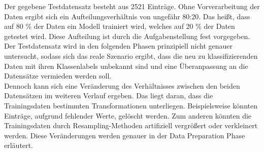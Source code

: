 Der gegebene Testdatensatz besteht aus 2521 Einträge. Ohne Vorverarbeitung der Daten ergibt sich ein Aufteilungsverhältnis von ungefähr 80:20. Das heißt, dass auf 80 \%  der Daten ein Modell trainiert wird, welches auf 20 \% der Daten getestet wird. Diese Aufteilung ist durch die Aufgabenstellung fest vorgegeben. Der Testdatensatz wird in den folgenden Phasen prinzipiell nicht genauer untersucht, sodass sich das reale Szenario ergibt, dass die neu zu klassifizierenden Daten mit ihren Klassenlabels unbekannt sind und eine Überanpassung an die Datensätze vermieden werden soll.\\

Dennoch kann sich eine Veränderung des Verhältnisses zwischen den beiden Datensätzen im weiteren Verlauf ergeben. Das liegt daran, dass die Trainingsdaten bestimmten Transformationen unterliegen. Beispielsweise könnten Einträge, aufgrund fehlender Werte, gelöscht werden. Zum anderen könnten die Trainingsdaten durch Resampling-Methoden artifiziell vergrößert oder verkleinert werden. Diese Veränderungen werden genauer in der Data Preparation Phase erläutert.\\ 

